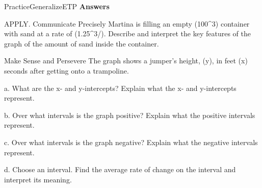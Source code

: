 \documentclass{article}
\newenvironment{practice}[2]{}{}        %
\newenvironment{te-addendum}[2]{}{}     %
\newcommand{\answer}[1]{}               %
\newcommand{\placeholder}[2]{}          %
\newcommand{\te}[1]{}                   %
\begin{document}
\begin{te-addendum}{Practice}{GeneralizeETP}
\textbf{Answers}
\te{The answers to Exercises 14–16 printed at the top left of this page are attached to their corresponding practice blocks above. Practice \& Problem Solving is available at SavvasRealize.com.}
\end{te-addendum}
\begin{practice}{28}{3}
APPLY. Communicate Precisely Martina is filling an empty (100^3) container with sand at a rate of (1.25^3/). Describe and interpret the key features of the graph of the amount of sand inside the container.
\answer{The origin is the x and y intercept and informs you the container is empty before it starts filling with sand. The domain is ([0,80]) which are the times when the container is filling with sand. The range is ([0,100]) which are the amounts of sand measured in cubic feet inside the container while it is filling.}
\end{practice}
\begin{practice}{29}{3}
Make Sense and Persevere The graph shows a jumper’s height, (y), in feet (x) seconds after getting onto a trampoline.
\placeholder{graph}{Green repeated downward-curved bounce arcs over a trampoline illustration with two jumpers. Horizontal x-axis “Time (Seconds),” labels 0.5, 1, 1.5, 2, 2.5 with small grid spacing approximately 0.125 second; vertical y-axis “Height (ft),” labels -0.5, 0.5, 1, 1.5 with small grid spacing approximately 0.125 foot. Origin O; axes arrowed. Curve starts at (0,-0.5), rises to a maximum near (0.375,1.75), falls to (0.75,-0.5), rises to (1.125,1.75), falls to (1.5,-0.5), rises to (1.875,1.75), falls to (2.25,-0.5). No individually marked points, endpoint circles, or curve arrows. Perspective illustration distorts the grid slightly.}
a. What are the x- and y-intercepts? Explain what the x- and y-intercepts represent.
\answer{a. The x-intercepts are approximately 0.05, 0.7, 0.8, 1.45, 1.55, and 2.2. The x-intercepts represent the moment the jumper is at the height of the frame of the trampoline. The y-intercept is (-0.5) and represents the sag of the trampoline when the jumper pushes down at the start of the first jump.}
b. Over what intervals is the graph positive? Explain what the positive intervals represent.
\answer{b. ((0.05,0.7)), ((0.8,1.45)), and ((1.55,2.2)); The positive intervals represent the times when the jumper is above the frame of the trampoline.}
c. Over what intervals is the graph negative? Explain what the negative intervals represent.
\answer{c. ((0,0.05)), ((0.7,0.8)), ((1.45,1.55)), and ((2.2,2.25)); The negative intervals represent the times when the jumper is below the frame of the trampoline.}
d. Choose an interval. Find the average rate of change on the interval and interpret its meaning.
\answer{d. Sample answer ([0.75,1.125]); 6 feet per second; The average rate of change over the interval ([0.75,1.125]) represents the average speed of the jumper on the upward part of a jump.}
\end{practice}
\end{document}
